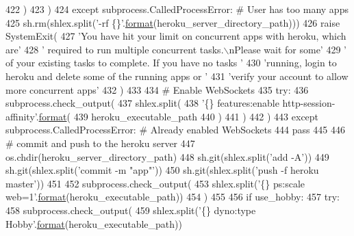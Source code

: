 \begin{DoxyCode}
422                 )
423             )
424     \textcolor{keywordflow}{except} subprocess.CalledProcessError:  \textcolor{comment}{# User has too many apps}
425         sh.rm(shlex.split(\textcolor{stringliteral}{'-rf \{\}'}.\hyperlink{namespaceparlai_1_1chat__service_1_1services_1_1messenger_1_1shared__utils_a32e2e2022b824fbaf80c747160b52a76}{format}(heroku\_server\_directory\_path)))
426         \textcolor{keywordflow}{raise} SystemExit(
427             \textcolor{stringliteral}{'You have hit your limit on concurrent apps with heroku, which are'}
428             \textcolor{stringliteral}{' required to run multiple concurrent tasks.\(\backslash\)nPlease wait for some'}
429             \textcolor{stringliteral}{' of your existing tasks to complete. If you have no tasks '}
430             \textcolor{stringliteral}{'running, login to heroku and delete some of the running apps or '}
431             \textcolor{stringliteral}{'verify your account to allow more concurrent apps'}
432         )
433 
434     \textcolor{comment}{# Enable WebSockets}
435     \textcolor{keywordflow}{try}:
436         subprocess.check\_output(
437             shlex.split(
438                 \textcolor{stringliteral}{'\{\} features:enable http-session-affinity'}.\hyperlink{namespaceparlai_1_1chat__service_1_1services_1_1messenger_1_1shared__utils_a32e2e2022b824fbaf80c747160b52a76}{format}(
439                     heroku\_executable\_path
440                 )
441             )
442         )
443     \textcolor{keywordflow}{except} subprocess.CalledProcessError:  \textcolor{comment}{# Already enabled WebSockets}
444         \textcolor{keywordflow}{pass}
445 
446     \textcolor{comment}{# commit and push to the heroku server}
447     os.chdir(heroku\_server\_directory\_path)
448     sh.git(shlex.split(\textcolor{stringliteral}{'add -A'}))
449     sh.git(shlex.split(\textcolor{stringliteral}{'commit -m "app"'}))
450     sh.git(shlex.split(\textcolor{stringliteral}{'push -f heroku master'}))
451 
452     subprocess.check\_output(
453         shlex.split(\textcolor{stringliteral}{'\{\} ps:scale web=1'}.\hyperlink{namespaceparlai_1_1chat__service_1_1services_1_1messenger_1_1shared__utils_a32e2e2022b824fbaf80c747160b52a76}{format}(heroku\_executable\_path))
454     )
455 
456     \textcolor{keywordflow}{if} use\_hobby:
457         \textcolor{keywordflow}{try}:
458             subprocess.check\_output(
459                 shlex.split(\textcolor{stringliteral}{'\{\} dyno:type Hobby'}.\hyperlink{namespaceparlai_1_1chat__service_1_1services_1_1messenger_1_1shared__utils_a32e2e2022b824fbaf80c747160b52a76}{format}(heroku\_executable\_path))

\end{DoxyCode}
